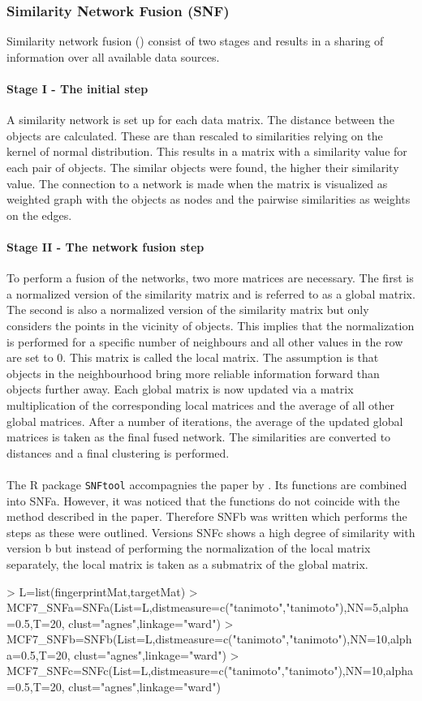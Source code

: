 \documentclass[a4paper]{article}
\begin{document}
\subsubsection{Similarity Network Fusion (SNF)}
Similarity network fusion (\cite{Wang2014}) consist of two stages and results in
a sharing of information over all available data sources.
\paragraph{Stage I - The initial step}
A similarity network is set up for each data matrix. The distance between
the objects are calculated. These are than rescaled to similarities
relying on the kernel of normal distribution. This results in a matrix with a
similarity value for each pair of objects. The similar objects were
found, the higher their similarity value. The connection to a network is made
when the matrix is visualized as weighted graph with the objects as nodes and
the pairwise similarities as weights on the edges. 
\paragraph{Stage II - The network fusion step}
To perform a fusion of the networks, two more matrices are necessary. The first
is a normalized version of the similarity matrix and is referred to as a global
matrix. The second is also a normalized version of the similarity matrix but
only considers the points in the vicinity of objects. This implies that the
normalization is performed for a specific number of neighbours and all other
values in the row are set to $0$. This matrix is called the local matrix. The assumption is
that objects in the neighbourhood bring more reliable information forward
than objects further away. Each global matrix is now updated via a matrix
multiplication of the corresponding local matrices and the average of all other
global matrices. After a number of iterations, the average of the updated global
matrices is taken as the final fused network. The similarities are converted to
distances and a final clustering is performed.\\ \\
The R package \texttt{SNFtool} accompagnies the paper by \cite{Wang2014}.
Its functions are combined into SNFa. However, it was noticed that the functions 
do not coincide with the method described in the paper. Therefore SNFb was
written which performs the steps as these were outlined. Versions SNFc shows a
high degree of similarity with version b but instead of performing the
normalization of the local matrix separately, the local matrix is taken as a
submatrix of the global matrix.
\begin{Schunk}
\begin{Sinput}
> L=list(fingerprintMat,targetMat)
> MCF7_SNFa=SNFa(List=L,distmeasure=c("tanimoto","tanimoto"),NN=5,alpha=0.5,T=20,
                clust="agnes",linkage="ward")
> MCF7_SNFb=SNFb(List=L,distmeasure=c("tanimoto","tanimoto"),NN=10,alpha=0.5,T=20,
                clust="agnes",linkage="ward")
> MCF7_SNFc=SNFc(List=L,distmeasure=c("tanimoto","tanimoto"),NN=10,alpha=0.5,T=20,
                clust="agnes",linkage="ward")	   
\end{Sinput}
\end{Schunk}
\end{document}
